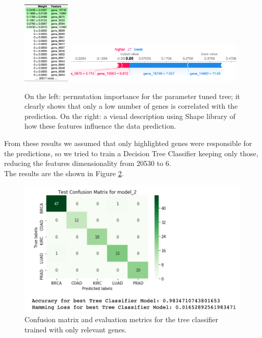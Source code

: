 \documentclass[12pt]{article}
\begin{document}
\begin{figure}[H]
\centering
\includegraphics[width=0.2\textwidth]{img/perm}
\includegraphics[width=0.77\textwidth]{img/shap.png}
\caption{On the left: permutation importance for the parameter tuned tree; it clearly shows that only a low number of genes is correlated with the prediction. On the right: a visual description using Shape library of how these features influence the data prediction.}
\label{fig_perm}
\end{figure}


From these results we assumed that only highlighted genes were responsible for the predictions, so we tried to train a Decision Tree Classifier keeping only those, reducing the features dimensionality from 20530 to 6. \\
The results are the shown in Figure \ref{fig_perm_m}.


\begin{figure}[h!]
\centering
\includegraphics[width=120mm]{img/perm_matrix}
\caption{Confusion matrix and evaluation metrics for the tree classifier trained with only relevant genes.}
\label{fig_perm_m}
\end{figure}
\end{document}
